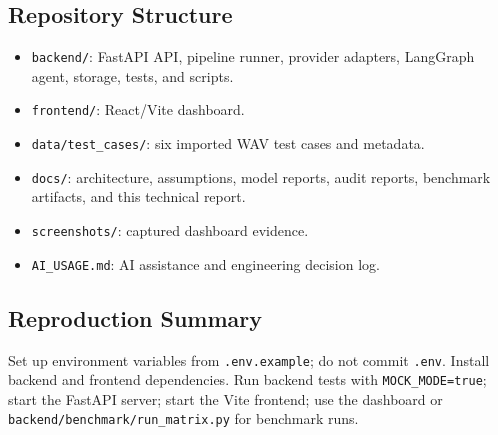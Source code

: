 \documentclass[11pt,a4paper]{article}
\begin{document}
\subsection{Repository Structure}

\begin{itemize}
  \item \texttt{backend/}: FastAPI API, pipeline runner, provider adapters,
  LangGraph agent, storage, tests, and scripts.
  \item \texttt{frontend/}: React/Vite dashboard.
  \item \texttt{data/test\_cases/}: six imported WAV test cases and metadata.
  \item \texttt{docs/}: architecture, assumptions, model reports, audit reports,
  benchmark artifacts, and this technical report.
  \item \texttt{screenshots/}: captured dashboard evidence.
  \item \texttt{AI\_USAGE.md}: AI assistance and engineering decision log.
\end{itemize}

\subsection{Reproduction Summary}

Set up environment variables from \texttt{.env.example}; do not commit
\texttt{.env}. Install backend and frontend dependencies. Run backend tests with
\texttt{MOCK\_MODE=true}; start the FastAPI server; start the Vite frontend; use
the dashboard or \texttt{backend/benchmark/run\_matrix.py} for benchmark runs.



\end{document}
